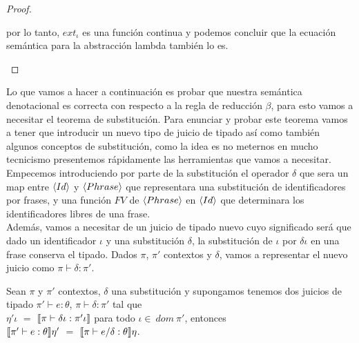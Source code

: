 \begin{proof}
\begin{itemize}
\begin{itemize}
por lo tanto, $ext_\iota$ es una funci\'on continua y podemos concluir que
la ecuaci\'on sem\'antica para la abstracci\'on lambda tambi\'en lo es.

\end{itemize}
\end{itemize}
\end{proof}

Lo que vamos a hacer a continuaci\'on es probar que nuestra sem\'antica 
denotacional es correcta con respecto a la regla de reducci\'on $\beta$, para esto
vamos a necesitar el teorema de substituci\'on. Para enunciar y probar este teorema
vamos a tener que introducir un nuevo tipo de juicio de tipado as\'i como tambi\'en
algunos conceptos de substituci\'on, como la idea es no meternos en mucho tecnicismo
presentemos r\'apidamente las herramientas que vamos a necesitar.\\

Empecemos introduciendo por parte de la substituci\'on el operador $\delta$ que 
sera un map entre $\langle Id \rangle$ y $\langle Phrase \rangle$ que representara una
substituci\'on de identificadores por frases, y una funci\'on
$FV$ de $\langle Phrase \rangle$ en $\langle Id \rangle$ que determinara los
identificadores libres de una frase.\\

Adem\'as, vamos a necesitar de un juicio de tipado nuevo cuyo significado
ser\'a que dado un identificador $\iota$ y una substituci\'on $\delta$, 
la substituci\'on de $\iota$ por $\delta\iota$ en una frase conserva el 
tipado. Dados $\pi$, $\pi'$ contextos y $\delta$, vamos a representar el 
nuevo juicio como $\pi \vdash \delta : \pi'$.

\begin{theorem}[De substituci\'on]
Sean $\pi$ y $\pi'$ contextos, $\delta$ una substituci\'on y supongamos
tenemos dos juicios de tipado $\pi' \vdash e : \theta$, $\pi \vdash \delta : \pi'$ 
tal que \\

$\eta'\iota$ $=$ $\llbracket \pi \vdash \delta\iota : \pi'\iota \rrbracket$
para todo $\iota \in \ dom \ \pi'$, entonces\\
 
$\llbracket \pi' \vdash e : \theta \rrbracket\eta'$ $=$ $\llbracket \pi \vdash e / \delta : \theta \rrbracket\eta$.

\end{theorem}


